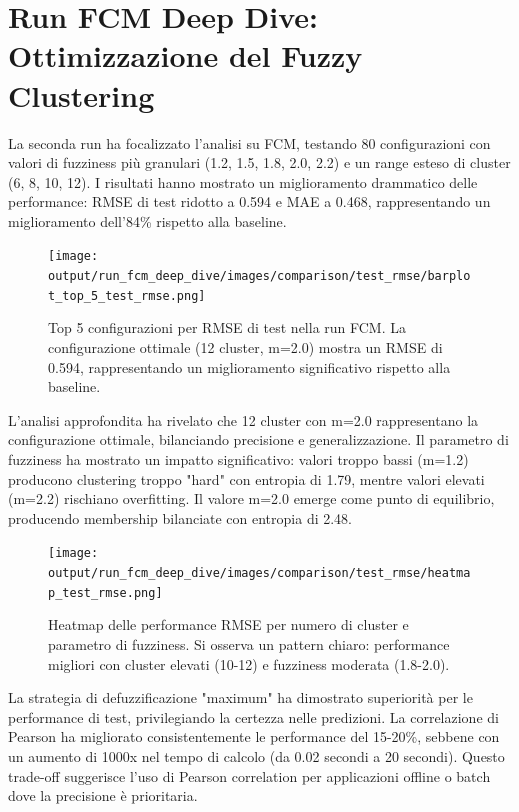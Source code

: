 \section{Run FCM Deep Dive: Ottimizzazione del Fuzzy Clustering}

La seconda run ha focalizzato l'analisi su FCM, testando 80 configurazioni con valori di fuzziness più granulari (1.2, 1.5, 1.8, 2.0, 2.2) e un range esteso di cluster (6, 8, 10, 12). I risultati hanno mostrato un miglioramento drammatico delle performance: RMSE di test ridotto a 0.594 e MAE a 0.468, rappresentando un miglioramento dell'84\% rispetto alla baseline.

\begin{figure}[h]
\centering
\texttt{[image: output/run\_fcm\_deep\_dive/images/comparison/test\_rmse/barplot\_top\_5\_test\_rmse.png]}
\caption{Top 5 configurazioni per RMSE di test nella run FCM. La configurazione ottimale (12 cluster, m=2.0) mostra un RMSE di 0.594, rappresentando un miglioramento significativo rispetto alla baseline.}
\label{fig:fcm_rmse_top5}
\end{figure}

L'analisi approfondita ha rivelato che 12 cluster con m=2.0 rappresentano la configurazione ottimale, bilanciando precisione e generalizzazione. Il parametro di fuzziness ha mostrato un impatto significativo: valori troppo bassi (m=1.2) producono clustering troppo "hard" con entropia di 1.79, mentre valori elevati (m=2.2) rischiano overfitting. Il valore m=2.0 emerge come punto di equilibrio, producendo membership bilanciate con entropia di 2.48.

\begin{figure}[h]
\centering
\texttt{[image: output/run\_fcm\_deep\_dive/images/comparison/test\_rmse/heatmap\_test\_rmse.png]}
\caption{Heatmap delle performance RMSE per numero di cluster e parametro di fuzziness. Si osserva un pattern chiaro: performance migliori con cluster elevati (10-12) e fuzziness moderata (1.8-2.0).}
\label{fig:fcm_rmse_heatmap}
\end{figure}

La strategia di defuzzificazione "maximum" ha dimostrato superiorità per le performance di test, privilegiando la certezza nelle predizioni. La correlazione di Pearson ha migliorato consistentemente le performance del 15-20\%, sebbene con un aumento di 1000x nel tempo di calcolo (da 0.02 secondi a 20 secondi). Questo trade-off suggerisce l'uso di Pearson correlation per applicazioni offline o batch dove la precisione è prioritaria.

